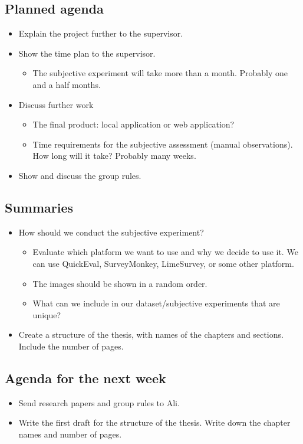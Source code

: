\subsection*{Planned agenda}
\begin{itemize}
    \item Explain the project further to the supervisor.
    \item Show the time plan to the supervisor.
        \begin{itemize}
            \item The subjective experiment will take more than a month. Probably one and a half months.
    \end{itemize}
    \item Discuss further work
    \begin{itemize}
        \item The final product: local application or web application?
        \item Time requirements for the subjective assessment (manual observations). How long will it take? Probably many weeks.
    \end{itemize}
    \item Show and discuss the group rules.
\end{itemize}

\subsection*{Summaries}
\begin{itemize}
    \item How should we conduct the subjective experiment?
    \begin{itemize}
        \item Evaluate which platform we want to use and why we decide to use it. We can use QuickEval, SurveyMonkey, LimeSurvey, or some other platform.
        \item The images should be shown in a random order.
        \item What can we include in our dataset/subjective experiments that are unique?
    \end{itemize}
    \item Create a structure of the thesis, with names of the chapters and sections. Include the number of pages. 
\end{itemize}

\subsection*{Agenda for the next week}
\begin{itemize}
    \item Send research papers and group rules to Ali.
    \item Write the first draft for the structure of the thesis. Write down the chapter names and number of pages.
\end{itemize}

